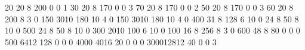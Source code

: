   {20} {20} {8} {200} {0}  {0}  {1}   %
     {30} {20} {8} {170} {0}  {0}  {3}   %
    {70} {20} {8} {170} {0}  {0}  {2}   %
    {50} {20} {8} {170} {0}  {0}  {3}   %
  {60} {20} {8} {200} {8}  {3}  {0}   %
 {150} {30}{10} {180} {10} {4}  {0}   %
   {150} {30}{10} {180} {10} {4}  {0}   %
 {400} {31} {8} {128} {6}  {10} {0}   %
 {24} {8}  {50} {8}  {10} {0}   %
   {500} {24} {8}  {50} {8}  {10} {0}   %
   {300} {20}{10} {100} {6}  {10} {0}   %
 {100} {16} {8} {256} {8}  {3}  {0}   %
   {600} {48} {8}  {80} {0}  {0}  {0}   %
   {500} {64}{12} {128} {0}  {0}  {0}   %
  {4000} {40}{16}  {20} {0}  {0}  {0}   %
   {3000}{128}{12}  {40} {0}  {0}  {3}   %

